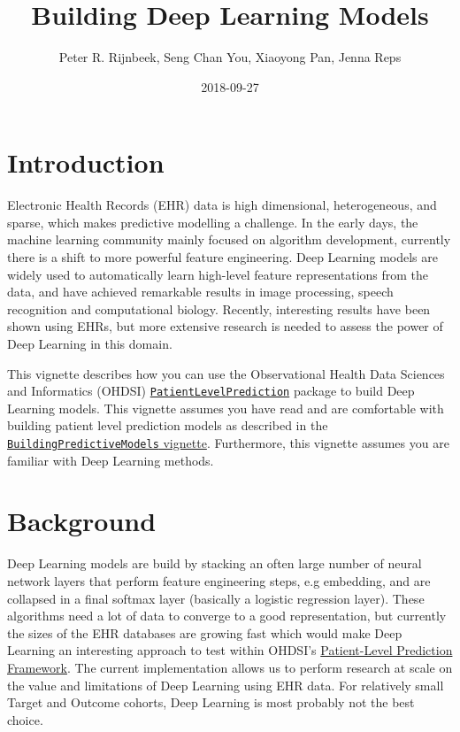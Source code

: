 \documentclass[]{article}
\title{Building Deep Learning Models}
\author{Peter R. Rijnbeek, Seng Chan You, Xiaoyong Pan, Jenna Reps}
\date{2018-09-27}
\begin{document}
\maketitle

{
\setcounter{tocdepth}{2}
\tableofcontents
}
\section{Introduction}\label{introduction}

Electronic Health Records (EHR) data is high dimensional, heterogeneous,
and sparse, which makes predictive modelling a challenge. In the early
days, the machine learning community mainly focused on algorithm
development, currently there is a shift to more powerful feature
engineering. Deep Learning models are widely used to automatically learn
high-level feature representations from the data, and have achieved
remarkable results in image processing, speech recognition and
computational biology. Recently, interesting results have been shown
using EHRs, but more extensive research is needed to assess the power of
Deep Learning in this domain.

This vignette describes how you can use the Observational Health Data
Sciences and Informatics (OHDSI)
\href{http://github.com/OHDSI/PatientLevelPrediction}{\texttt{PatientLevelPrediction}}
package to build Deep Learning models. This vignette assumes you have
read and are comfortable with building patient level prediction models
as described in the
\href{https://github.com/OHDSI/PatientLevelPrediction/blob/master/inst/doc/BuildingPredictiveModels.pdf}{\texttt{BuildingPredictiveModels}
vignette}. Furthermore, this vignette assumes you are familiar with Deep
Learning methods.

\section{Background}\label{background}

Deep Learning models are build by stacking an often large number of
neural network layers that perform feature engineering steps, e.g
embedding, and are collapsed in a final softmax layer (basically a
logistic regression layer). These algorithms need a lot of data to
converge to a good representation, but currently the sizes of the EHR
databases are growing fast which would make Deep Learning an interesting
approach to test within OHDSI's
\href{https://academic.oup.com/jamia/article/25/8/969/4989437}{Patient-Level
Prediction Framework}. The current implementation allows us to perform
research at scale on the value and limitations of Deep Learning using
EHR data. For relatively small Target and Outcome cohorts, Deep Learning
is most probably not the best choice.
\end{document}
